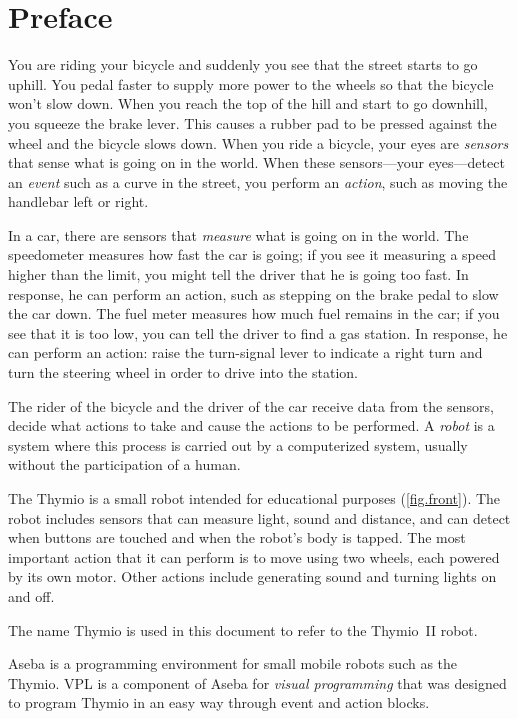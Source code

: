 \chapter*{Preface}


You are riding your bicycle and suddenly you see that the street starts
to go uphill. You pedal faster to supply more power to the wheels so
that the bicycle won't slow down. When you reach the top of the hill and
start to go downhill, you squeeze the brake lever. This causes a rubber
pad to be pressed against the wheel and the bicycle slows down. When you
ride a bicycle, your eyes are \textit{sensors} that sense what is going
on in the world. When these sensors---your eyes---detect an
\textit{event} such as a curve in the street, you perform an
\textit{action}, such as moving the handlebar left or right.

In a car, there are sensors that \textit{measure} what is going on in
the world. The speedometer measures how fast the car is going; if you
see it measuring a speed higher than the limit, you might tell the
driver that he is going too fast. In response, he can perform an action,
such as stepping on the brake pedal to slow the car down. The fuel meter
measures how much fuel remains in the car; if you see that it is too
low, you can tell the driver to find a gas station. In response, he can
perform an action: raise the turn-signal lever to indicate a right turn
and turn the steering wheel in order to drive into the station.

The rider of the bicycle and the driver of the car receive data from the
sensors, decide what actions to take and cause the actions to be
performed. A \textit{robot} is a system where this process is carried out by a
computerized system, usually without the participation of a human.


The Thymio is a small robot intended for educational purposes
(\cref{fig.front}). The robot includes sensors that can measure light,
sound and distance, and can detect when buttons are touched and when the
robot's body is tapped. The most important action that it can perform is
to move using two wheels, each powered by its own motor. Other actions
include generating sound and turning lights on and off.

The name Thymio is used in this document to refer to the Thymio~II
robot.

Aseba is a programming environment for small mobile robots such as the
Thymio. VPL is a component of Aseba for \textit{visual programming} that
was designed to program Thymio in an easy way through event and action
blocks.

